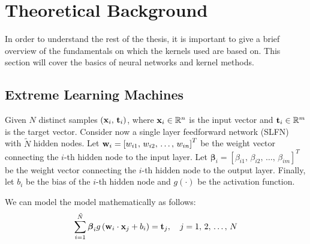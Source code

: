 \chapter{Theoretical Background}%
\label{sec:theoretical_background}

In order to understand the rest of the thesis, it is important to give a brief
overview of the fundamentals on which the kernels used are based on. This
section will cover the basics of neural networks and kernel methods.

\section{Extreme Learning Machines}%
\label{sub:neural_networks_fundamentals}

Given $N$ distinct samples $\left( \textbf x_i,\, \textbf t_i \right)$,
where $\textbf x_i \in \mathbb{R}^n$ is the input vector and
$\textbf t_i \in \mathbb{R}^m$ is the target vector. Consider now a single layer
feedforward network (SLFN) with $\tilde{N}$ hidden nodes.
Let $\textbf w_i = \left[ w_{i1},\,w_{i2},\,\dots,\,w_{in} \right]^T$ be the
weight vector connecting the $i$-th hidden node to the input layer.
Let $\boldsymbol\beta_i = \left[ \beta_{i1},\,\beta_{i2},\,\dots,\,\beta_{im} \right]^T$
be the weight vector connecting the $i$-th hidden node to the output layer.
Finally, let $b_i$ be the bias of the $i$-th hidden node and $g(\cdot)$ be the
activation function.

We can model the model mathematically as follows:
\begin{equation}%
    \label{eq:slfn}
    \sum_{i=1}^{\tilde{N}} \boldsymbol\beta_{i} g\left( \textbf w_i \cdot \textbf x_j + b_i \right) = \textbf t_j, \quad j = 1,\,2,\,\dots,\,N
\end{equation}

